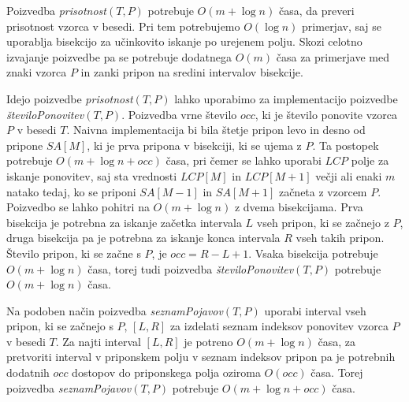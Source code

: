 Poizvedba \textit{prisotnost}$(T,P)$ potrebuje $O(m+\log{n})$ časa, da preveri prisotnost vzorca v besedi. Pri tem potrebujemo $O(\log{n})$ primerjav, saj se uporablja bisekcijo za učinkovito iskanje po urejenem polju. Skozi celotno izvajanje poizvedbe pa se potrebuje dodatnega $O(m)$ časa za primerjave med znaki vzorca $P$ in zanki pripon na sredini intervalov bisekcije.


Idejo poizvedbe \textit{prisotnost}$(T,P)$ lahko uporabimo za implementacijo poizvedbe \textit{številoPonovitev}$(T,P)$. Poizvedba vrne število $occ$, ki je število ponovite vzorca $P$ v besedi $T$. Naivna implementacija bi bila štetje pripon levo in desno od pripone $SA[M]$, ki je prva pripona v bisekciji, ki se ujema z $P$. Ta postopek potrebuje $O(m + \log{n}+occ)$ časa, pri čemer se lahko uporabi $LCP$ polje za iskanje ponovitev, saj sta vrednosti $LCP[M]$ in $LCP[M+1]$ večji ali enaki $m$ natako tedaj, ko se priponi $SA[M-1]$ in $SA[M+1]$ začneta z vzorcem $P$. Poizvedbo se lahko pohitri na $O(m + \log{n})$ z dvema bisekcijama. Prva bisekcija je potrebna za iskanje začetka intervala $L$ vseh pripon, ki se začnejo z $P$, druga bisekcija pa je potrebna za iskanje konca intervala $R$ vseh takih pripon. Število pripon, ki se začne s $P$, je $occ=R-L+1$. Vsaka bisekcija potrebuje $O(m+\log{n})$ časa, torej tudi poizvedba \textit{številoPonovitev}$(T,P)$ potrebuje $O(m+\log{n})$ časa.

Na podoben način poizvedba \textit{seznamPojavov}$(T,P)$ uporabi interval vseh pripon, ki se začnejo s $P$, $[L,R]$ za izdelati seznam indeksov ponovitev vzorca $P$ v besedi $T$. Za najti interval $[L,R]$ je potreno $O(m+\log{n})$ časa, za pretvoriti interval v priponskem polju v seznam indeksov pripon pa je potrebnih dodatnih $occ$ dostopov do priponskega polja oziroma $O(occ)$ časa. Torej poizvedba \textit{seznamPojavov}$(T,P)$ potrebuje $O(m+\log{n}+occ)$ časa.



